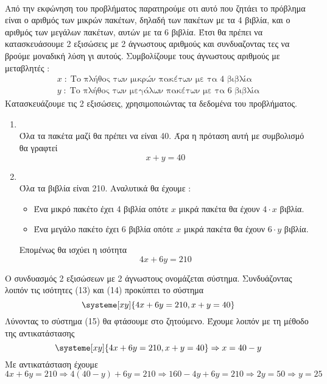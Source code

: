 \documentclass[twoside,nofonts,internet,methodoi]{thewria}
\begin{document}
\lysh\\
Από την εκφώνηση του προβλήματος παρατηρούμε οτι αυτό που ζητάει το πρόβλημα είναι ο αριθμός των μικρών πακέτων, δηλαδή των πακέτων με τα 4 βιβλία, και ο αριθμός των μεγάλων πακέτων, αυτών με τα 6 βιβλία. Έτσι θα πρέπει να κατασκευάσουμε 2 εξισώσεις με 2 άγνωστους αριθμούς και συνδυαζοντας τες να βρούμε μοναδική λύση γι αυτούς.
Συμβολίζουμε τους άγνωστους αριθμούς με μεταβλητές : \begin{gather}
x\;:\;\textrm{Το πλήθος των μικρών πακέτων με τα 4 βιβλία}\\
y\;:\;\textrm{Το πλήθος των μεγάλων πακέτων με τα 6 βιβλία}
\end{gather}
Κατασκευάζουμε τις 2 εξισώσεις, χρησιμοποιώντας τα δεδομένα του προβλήματος.
\begin{enumerate}[label=\bf\textit{\arabic*\textsuperscript{o}\;στοιχείο},leftmargin=0cm,itemindent=2cm]
\item \mbox{}\\Όλα τα πακέτα μαζί θα πρέπει να είναι 40. Άρα η πρόταση αυτή με συμβολισμό θα γραφτεί  \begin{equation}
x+y=40
\end{equation} 
\item \mbox{}\\Όλα τα βιβλία είναι 210. Αναλυτικά θα έχουμε : 
\begin{itemize}
\item Ένα μικρό πακέτο έχει 4 βιβλία οπότε $ x $ μικρά πακέτα θα έχουν $ 4\cdot x $ βιβλία.
\item Ένα μεγάλο πακέτο έχει 6 βιβλία οπότε $ x $ μικρά πακέτα θα έχουν $ 6\cdot y $ βιβλία.
\end{itemize}
Επομένως θα ισχύει η ισότητα \begin{equation}
4x+6y=210
\end{equation} 
\end{enumerate}
Ο συνδυασμός 2 εξισώσεων με 2 άγνωστους ονομάζεται σύστημα. Συνδυάζοντας λοιπόν τις ισότητες (13) και (14) προκύπτει το σύστημα \begin{equation}
\systeme[xy]{4x+6y=210,x+y=40}
\end{equation}
Λύνοντας το σύστημα (15) θα φτάσουμε στο ζητούμενο. Έχουμε λοιπόν με τη μέθοδο της αντικατάστασης
\begin{equation} 
\systeme[xy]{4x+6y=210,x+y=40}\Rightarrow x=40-y \end{equation}
Με αντικατάσταση έχουμε
\[ 4x+6y=210\Rightarrow 4(40-y)+6y=210\Rightarrow 160 -4y+6y=210\Rightarrow2y=50\Rightarrow y=25 \]
\end{document}
